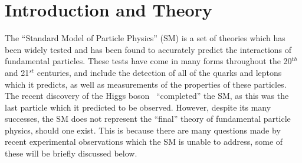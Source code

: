 
\chapter{Introduction and Theory} \label{chap:Theory} %

\newcommand{\Dmq}{\Delta m^2}
\newcommand{\eVq}{\ensuremath{\text{eV}^2}}

\graphicspath{{Theory/Figs/Raster/}{Theory/Figs/PDF/}{Theory/Figs/Vector/}}





The ``Standard Model of Particle Physics'' (SM) is a set of theories which has been widely tested and has been found to accurately predict the interactions of fundamental particles. These tests have come in many forms throughout the 20$^{th}$ and 21$^{st}$ centuries, and include the detection of all of the quarks and leptons which it predicts, as well as measurements of the properties of these particles. The recent discovery of the Higgs boson~\citep{HiggsAtlas, HiggsCMS} ``completed'' the SM, as this was the last particle which it predicted to be observed. However, despite its many successes, the SM does not represent the ``final'' theory of fundamental particle physics, should one exist. This is because there are many questions made by recent experimental observations which the SM is unable to address, some of these will be briefly discussed below. \\

